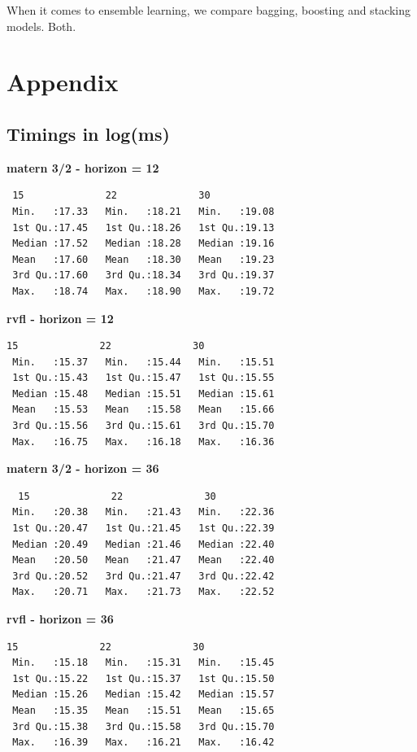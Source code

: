 When it comes to ensemble learning, we compare bagging, boosting and stacking models. Both.

\newpage

\section{Appendix}

\subsection{Timings in log(ms)}
\label{sec:timings}

\textbf{matern 3/2 - horizon = 12}
\begin{verbatim}
 15              22              30       
 Min.   :17.33   Min.   :18.21   Min.   :19.08  
 1st Qu.:17.45   1st Qu.:18.26   1st Qu.:19.13  
 Median :17.52   Median :18.28   Median :19.16  
 Mean   :17.60   Mean   :18.30   Mean   :19.23  
 3rd Qu.:17.60   3rd Qu.:18.34   3rd Qu.:19.37  
 Max.   :18.74   Max.   :18.90   Max.   :19.72
\end{verbatim}

\textbf{rvfl - horizon = 12}
\begin{verbatim}
15              22              30       
 Min.   :15.37   Min.   :15.44   Min.   :15.51  
 1st Qu.:15.43   1st Qu.:15.47   1st Qu.:15.55  
 Median :15.48   Median :15.51   Median :15.61  
 Mean   :15.53   Mean   :15.58   Mean   :15.66  
 3rd Qu.:15.56   3rd Qu.:15.61   3rd Qu.:15.70  
 Max.   :16.75   Max.   :16.18   Max.   :16.36
\end{verbatim}

\textbf{matern 3/2 - horizon = 36}
\begin{verbatim}
  15              22              30       
 Min.   :20.38   Min.   :21.43   Min.   :22.36  
 1st Qu.:20.47   1st Qu.:21.45   1st Qu.:22.39  
 Median :20.49   Median :21.46   Median :22.40  
 Mean   :20.50   Mean   :21.47   Mean   :22.40  
 3rd Qu.:20.52   3rd Qu.:21.47   3rd Qu.:22.42  
 Max.   :20.71   Max.   :21.73   Max.   :22.52
\end{verbatim}

\textbf{rvfl - horizon = 36}
\begin{verbatim}
15              22              30       
 Min.   :15.18   Min.   :15.31   Min.   :15.45  
 1st Qu.:15.22   1st Qu.:15.37   1st Qu.:15.50  
 Median :15.26   Median :15.42   Median :15.57  
 Mean   :15.35   Mean   :15.51   Mean   :15.65  
 3rd Qu.:15.38   3rd Qu.:15.58   3rd Qu.:15.70  
 Max.   :16.39   Max.   :16.21   Max.   :16.42
\end{verbatim}
